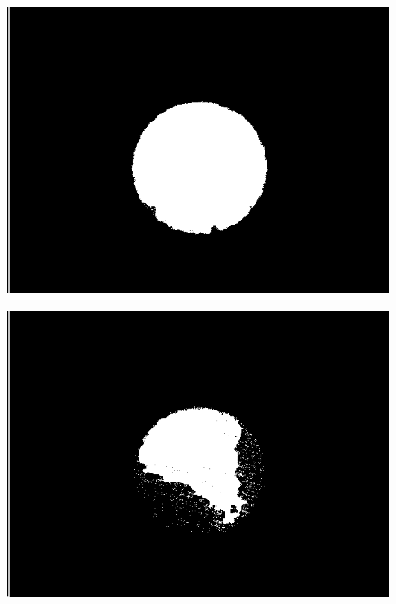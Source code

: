 \documentclass[12pt,a4paper]{article}
\begin{document}
\begin{figure}[!htbp]
\begin{minipage}{0.48\linewidth}
        \centering
        \includegraphics[width=\linewidth]{ptile.png}
        \label{fig:ptile}
    \end{minipage} \hfill
    \begin{minipage}{0.48\linewidth}
        \centering
        \includegraphics[width=\linewidth]{moment.png}
        \label{fig:moment}
    \end{minipage} \\
    \begin{minipage}{0.48\linewidth}
        \centering

\end{minipage}
\end{figure}
\end{document}
